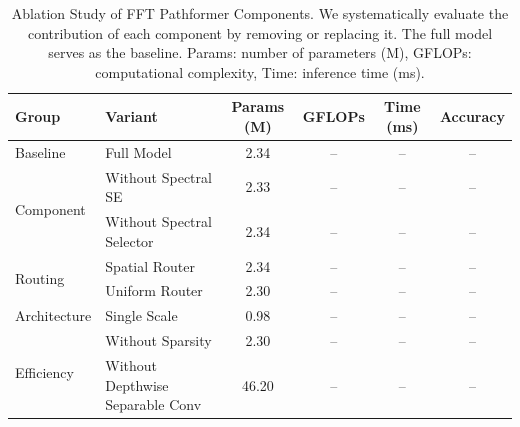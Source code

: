 
\begin{table}[t]
\centering
\caption{Ablation Study of FFT Pathformer Components. We systematically evaluate the contribution 
of each component by removing or replacing it. The full model serves as the baseline. 
Params: number of parameters (M), GFLOPs: computational complexity, Time: inference time (ms).}
\label{tab:ablation}
\begin{tabular}{llcccc}
\toprule
\textbf{Group} & \textbf{Variant} & \textbf{Params (M)} & \textbf{GFLOPs} & \textbf{Time (ms)} & \textbf{Accuracy} \\
\midrule
\multirow{1}{*}{Baseline} & Full Model & 2.34 & -- & -- & -- \\
\midrule
\multirow{2}{*}{Component} & Without Spectral SE & 2.33 & -- & -- & -- \\
 & Without Spectral Selector & 2.34 & -- & -- & -- \\
\midrule
\multirow{2}{*}{Routing} & Spatial Router & 2.34 & -- & -- & -- \\
 & Uniform Router & 2.30 & -- & -- & -- \\
\midrule
\multirow{1}{*}{Architecture} & Single Scale & 0.98 & -- & -- & -- \\
\midrule
\multirow{2}{*}{Efficiency} & Without Sparsity & 2.30 & -- & -- & -- \\
 & Without Depthwise Separable Conv & 46.20 & -- & -- & -- \\
\bottomrule
\end{tabular}
\end{table}
